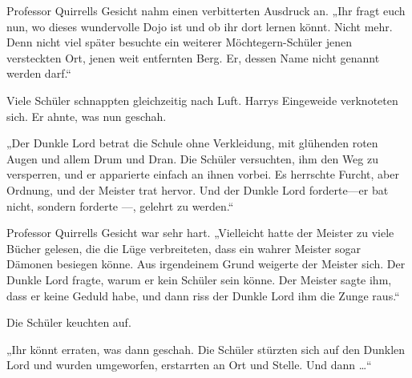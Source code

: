 Professor Quirrells Gesicht nahm einen verbitterten Ausdruck an. „Ihr fragt euch nun, wo dieses wundervolle Dojo ist und ob ihr dort lernen könnt. Nicht mehr. Denn nicht viel später besuchte ein weiterer Möchtegern-Schüler jenen versteckten Ort, jenen weit entfernten Berg. Er, dessen Name nicht genannt werden darf.“

Viele Schüler schnappten gleichzeitig nach Luft. Harrys Eingeweide verknoteten sich. Er ahnte, was nun geschah.

„Der Dunkle Lord betrat die Schule ohne Verkleidung, mit glühenden roten Augen und allem Drum und Dran. Die Schüler versuchten, ihm den Weg zu versperren, und er apparierte einfach an ihnen vorbei. Es herrschte Furcht, aber Ordnung, und der Meister trat hervor. Und der Dunkle Lord forderte—er bat nicht, sondern forderte —, gelehrt zu werden.“

Professor Quirrells Gesicht war sehr hart. „Vielleicht hatte der Meister zu viele Bücher gelesen, die die Lüge verbreiteten, dass ein wahrer Meister sogar Dämonen besiegen könne. Aus irgendeinem Grund weigerte der Meister sich. Der Dunkle Lord fragte, warum er kein Schüler sein könne. Der Meister sagte ihm, dass er keine Geduld habe, und dann riss der Dunkle Lord ihm die Zunge raus.“

Die Schüler keuchten auf.

„Ihr könnt erraten, was dann geschah. Die Schüler stürzten sich auf den Dunklen Lord und wurden umgeworfen, erstarrten an Ort und Stelle. Und dann …“

